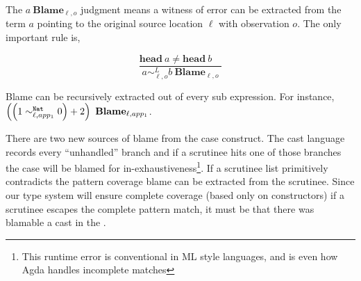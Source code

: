 The $a\ \mathbf{Blame}_{\ell,o}$ judgment means a witness of error can be extracted from the term $a$ pointing to the original source location $\ell$ with observation $o$.
The only important rule is,

\[
\frac{\mathbf{head}\ a\neq\mathbf{head}\ b\quad}{a\sim_{\ell,o}^{L}b\ \mathbf{Blame}_{\ell,o}}
\]

Blame can be recursively extracted out of every sub expression.
For instance, $\left(\left(1\sim_{\ell,app_{1}}^{\mathtt{Nat}{} }0\right)+2\right)\ \mathbf{Blame}_{\ell,app_{1}}$.

There are two new sources of blame from the case construct.
The cast language records every ``unhandled'' branch and if a scrutinee hits one of those branches the case will be blamed for in-exhaustiveness\footnote{
  This runtime error is conventional in ML style languages, and is even
how Agda handles incomplete matches }.
If a scrutinee list primitively contradicts the pattern coverage blame can be extracted from the scrutinee. 
Since our type system will ensure complete coverage (based only on constructors) if a scrutinee escapes the complete pattern match, it must be that there was blamable a cast in the \scrut.






